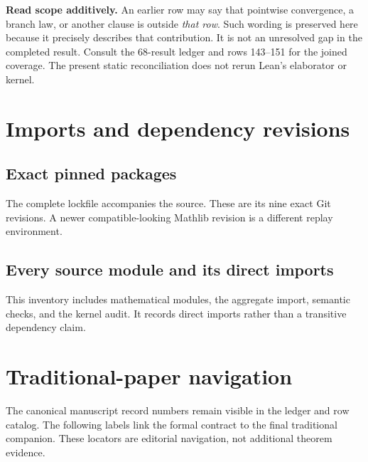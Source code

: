 \textbf{Read scope additively.} An earlier row may say that pointwise convergence, a branch law, or another clause is outside \emph{that row}. Such wording is preserved here because it precisely describes that contribution. It is not an unresolved gap in the completed result. Consult the 68-result ledger and rows 143--151 for the joined coverage. The present static reconciliation does not rerun Lean's elaborator or kernel.

\clearpage
\section{Imports and dependency revisions}
\subsection{Exact pinned packages}
The complete lockfile accompanies the source. These are its nine exact Git revisions. A newer compatible-looking Mathlib revision is a different replay environment.

\subsection{Every source module and its direct imports}
This inventory includes mathematical modules, the aggregate import, semantic checks, and the kernel audit. It records direct imports rather than a transitive dependency claim.

\clearpage
\section{Traditional-paper navigation}
The canonical manuscript record numbers remain visible in the ledger and row catalog. The following labels link the formal contract to the final traditional companion. These locators are editorial navigation, not additional theorem evidence.


